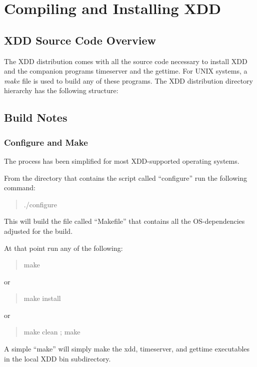\newpage
\section{Compiling and Installing XDD}\label{compiling-and-installing-xdd}

\subsection{XDD Source Code Overview}\label{xdd-source-code-overview}

The XDD distribution comes with all the source code necessary to install XDD and the companion programs timeserver and the gettime. For UNIX systems, a \emph{make} file is used to build any of these programs. The XDD distribution directory hierarchy has the following structure:

\subsection{Build Notes}\label{build-notes}

\subsubsection{Configure and Make}\label{configure-and-make}

The process has been simplified for most XDD-supported operating systems.

From the directory that contains the script called ``configure'' run the following command:

\begin{quote}
./configure
\end{quote}

This will build the file called ``Makefile'' that contains all the OS-dependencies adjusted for the build.

At that point run any of the following:

\begin{quote}
make
\end{quote}

or

\begin{quote}
make install
\end{quote}

or

\begin{quote}
make clean ; make
\end{quote}

A simple ``make'' will simply make the xdd, timeserver, and gettime executables in the local XDD bin subdirectory.

